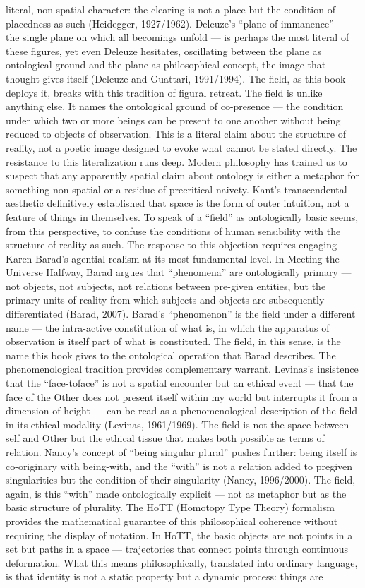 literal, non-spatial character: the clearing is not a place but the condition of placedness as such (Heidegger, 1927/1962). Deleuze’s “plane of immanence” — the single plane on which all becomings unfold — is perhaps the most literal of these figures, yet even Deleuze hesitates, oscillating between the plane as ontological ground and the plane as philosophical concept, the image that thought gives itself (Deleuze and Guattari, 1991/1994). The field, as this book deploys it, breaks with this tradition of figural retreat. The field is unlike anything else. It names the ontological ground of co-presence — the condition under which two or more beings can be present to one another without being reduced to objects of observation. This is a literal claim about the structure of reality, not a poetic image designed to evoke what cannot be stated directly. The resistance to this literalization runs deep. Modern philosophy has trained us to suspect that any apparently spatial claim about ontology is either a metaphor for something non-spatial or a residue of precritical naivety. Kant’s transcendental aesthetic definitively established that space is the form of outer intuition, not a feature of things in themselves. To speak of a “field” as ontologically basic seems, from this perspective, to confuse the conditions of human sensibility with the structure of reality as such. The response to this objection requires engaging Karen Barad’s agential realism at its most fundamental level. In Meeting the Universe Halfway, Barad argues that “phenomena” are ontologically primary — not objects, not subjects, not relations between pre-given entities, but the primary units of reality from which subjects and objects are subsequently differentiated (Barad, 2007). Barad’s “phenomenon” is the field under a different name — the intra-active constitution of what is, in which the apparatus of observation is itself part of what is constituted. The field, in this sense, is the name this book gives to the ontological operation that Barad describes. The phenomenological tradition provides complementary warrant. Levinas’s insistence that the “face-toface” is not a spatial encounter but an ethical event — that the face of the Other does not present itself within my world but interrupts it from a dimension of height — can be read as a phenomenological description of the field in its ethical modality (Levinas, 1961/1969). The field is not the space between self and Other but the ethical tissue that makes both possible as terms of relation. Nancy’s concept of “being singular plural” pushes further: being itself is co-originary with being-with, and the “with” is not a relation added to pregiven singularities but the condition of their singularity (Nancy, 1996/2000). The field, again, is this “with” made ontologically explicit — not as metaphor but as the basic structure of plurality. The HoTT (Homotopy Type Theory) formalism provides the mathematical guarantee of this philosophical coherence without requiring the display of notation. In HoTT, the basic objects are not points in a set but paths in a space — trajectories that connect points through continuous deformation. What this means philosophically, translated into ordinary language, is that identity is not a static property but a dynamic process: things are 